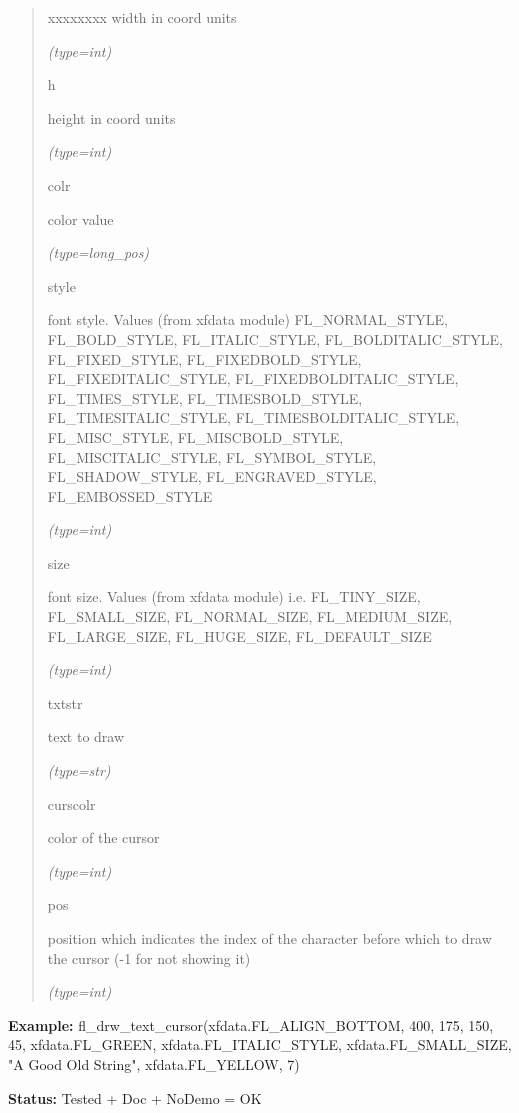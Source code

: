\begin{boxedminipage}{\funcwidth}
\begin{quote}
\begin{Ventry}{xxxxxxxx}
          width in coord units

            {\it (type=int)}

          \item[h]

          height in coord units

            {\it (type=int)}

          \item[colr]

          color value

            {\it (type=long\_pos)}

          \item[style]

          font style. Values (from xfdata module) FL\_NORMAL\_STYLE, 
          FL\_BOLD\_STYLE, FL\_ITALIC\_STYLE, FL\_BOLDITALIC\_STYLE, 
          FL\_FIXED\_STYLE, FL\_FIXEDBOLD\_STYLE, FL\_FIXEDITALIC\_STYLE, 
          FL\_FIXEDBOLDITALIC\_STYLE, FL\_TIMES\_STYLE, 
          FL\_TIMESBOLD\_STYLE, FL\_TIMESITALIC\_STYLE, 
          FL\_TIMESBOLDITALIC\_STYLE, FL\_MISC\_STYLE, FL\_MISCBOLD\_STYLE,
          FL\_MISCITALIC\_STYLE, FL\_SYMBOL\_STYLE, FL\_SHADOW\_STYLE, 
          FL\_ENGRAVED\_STYLE, FL\_EMBOSSED\_STYLE

            {\it (type=int)}

          \item[size]

          font size. Values (from xfdata module) i.e. FL\_TINY\_SIZE, 
          FL\_SMALL\_SIZE, FL\_NORMAL\_SIZE, FL\_MEDIUM\_SIZE, 
          FL\_LARGE\_SIZE, FL\_HUGE\_SIZE, FL\_DEFAULT\_SIZE

            {\it (type=int)}

          \item[txtstr]

          text to draw

            {\it (type=str)}

          \item[curscolr]

          color of the cursor

            {\it (type=int)}

          \item[pos]

          position which indicates the index of the character before which 
          to draw the cursor (-1 for not showing it)

            {\it (type=int)}

        \end{Ventry}

      \end{quote}

\textbf{Example:} fl\_drw\_text\_cursor(xfdata.FL\_ALIGN\_BOTTOM, 400, 175, 150, 45, 
xfdata.FL\_GREEN, xfdata.FL\_ITALIC\_STYLE, xfdata.FL\_SMALL\_SIZE, "A Good
Old String", xfdata.FL\_YELLOW, 7)



\textbf{Status:} Tested + Doc + NoDemo = OK



    \end{boxedminipage}

